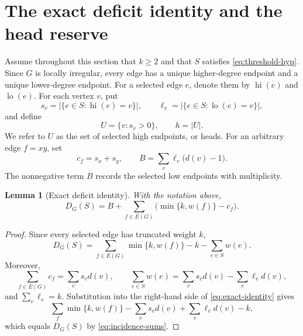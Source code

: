 \documentclass[a4paper,11pt]{amsart}
\numberwithin{equation}{section}
\newtheorem{lemma}[theorem]{Lemma}
\theoremstyle{definition}
\theoremstyle{remark}
\newcommand{\hi}{\operatorname{hi}}
\newcommand{\lo}{\operatorname{lo}}
\begin{document}
\section{The exact deficit identity and the head reserve}\label{sec:reserve}

Assume throughout this section that $k\ge2$ and that $S$ satisfies \eqref{eq:threshold-hyp}.  Since $G$ is locally irregular, every edge has a unique higher-degree endpoint and a unique lower-degree endpoint.  For a selected edge $e$, denote them by $\hi(e)$ and $\lo(e)$.  For each vertex $v$, put
\begin{equation}
s_v=\bigl\lvert\{e\in S:\hi(e)=v\}\bigr\rvert,
\qquad
\ell_v=\bigl\lvert\{e\in S:\lo(e)=v\}\bigr\rvert,
\label{eq:s-ell}
\end{equation}
and define
\begin{equation}
U=\{v:s_v>0\},\qquad h=\lvert U\rvert.
\label{eq:U-h}
\end{equation}
We refer to $U$ as the set of selected high endpoints, or heads.  For an arbitrary edge $f=xy$, set
\begin{equation}
c_f=s_x+s_y,
\qquad
B=\sum_v\ell_v\bigl(d(v)-1\bigr).
\label{eq:c-B}
\end{equation}
The nonnegative term $B$ records the selected low endpoints with multiplicity.

\begin{lemma}[Exact deficit identity]\label{lem:identity}
With the notation above,
\begin{equation}
D_G(S)
=B+\sum_{f\in E(G)}\bigl(\min\{k,w(f)\}-c_f\bigr).
\label{eq:exact-identity}
\end{equation}
\end{lemma}

\begin{proof}
Since every selected edge has truncated weight $k$,
\begin{equation*}
D_G(S)=\sum_{f\in E(G)}\min\{k,w(f)\}-k-\sum_{e\in S}w(e).
\end{equation*}
Moreover,
\begin{equation}
\sum_{f\in E(G)}c_f=\sum_v s_vd(v),
\qquad
\sum_{e\in S}w(e)=\sum_v s_vd(v)-\sum_v\ell_vd(v),
\label{eq:incidence-sums}
\end{equation}
and $\sum_v\ell_v=k$.  Substitution into the right-hand side of \eqref{eq:exact-identity} gives
\[
\sum_f\min\{k,w(f)\}-\sum_v s_vd(v)
 +\sum_v\ell_vd(v)-k,
\]
which equals $D_G(S)$ by \eqref{eq:incidence-sums}.
\end{proof}
\end{document}
